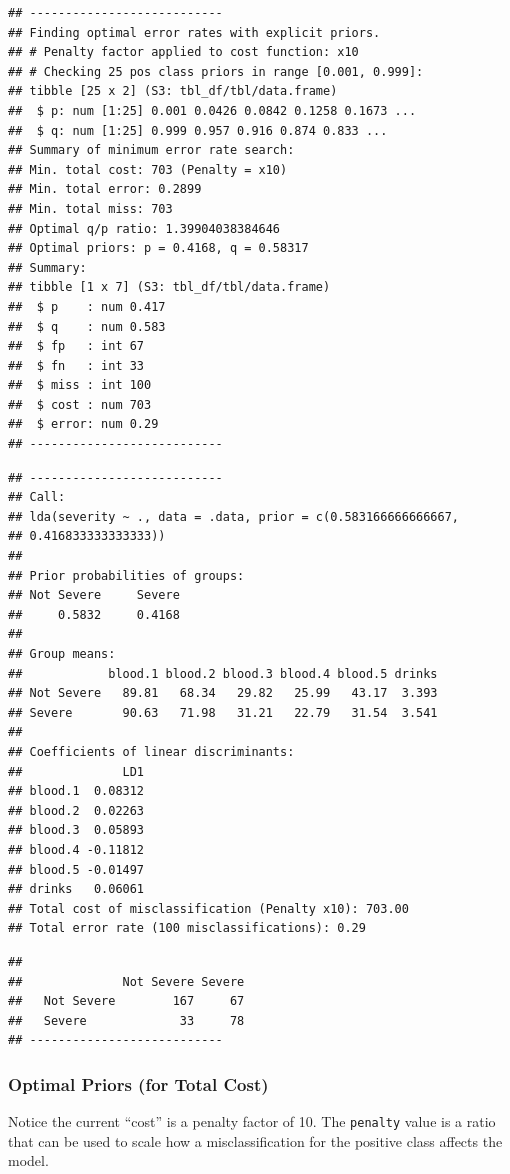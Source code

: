 \documentclass[
  11pt,
  a4paper,
]{scrartcl}
\begin{document}
\begin{verbatim}
## ---------------------------
## Finding optimal error rates with explicit priors.
## # Penalty factor applied to cost function: x10
## # Checking 25 pos class priors in range [0.001, 0.999]:
## tibble [25 x 2] (S3: tbl_df/tbl/data.frame)
##  $ p: num [1:25] 0.001 0.0426 0.0842 0.1258 0.1673 ...
##  $ q: num [1:25] 0.999 0.957 0.916 0.874 0.833 ...
## Summary of minimum error rate search:
## Min. total cost: 703 (Penalty = x10)
## Min. total error: 0.2899
## Min. total miss: 703
## Optimal q/p ratio: 1.39904038384646
## Optimal priors: p = 0.4168, q = 0.58317
## Summary: 
## tibble [1 x 7] (S3: tbl_df/tbl/data.frame)
##  $ p    : num 0.417
##  $ q    : num 0.583
##  $ fp   : int 67
##  $ fn   : int 33
##  $ miss : int 100
##  $ cost : num 703
##  $ error: num 0.29
## ---------------------------
\end{verbatim}

\begin{verbatim}
## ---------------------------
## Call:
## lda(severity ~ ., data = .data, prior = c(0.583166666666667, 
## 0.416833333333333))
## 
## Prior probabilities of groups:
## Not Severe     Severe 
##     0.5832     0.4168 
## 
## Group means:
##            blood.1 blood.2 blood.3 blood.4 blood.5 drinks
## Not Severe   89.81   68.34   29.82   25.99   43.17  3.393
## Severe       90.63   71.98   31.21   22.79   31.54  3.541
## 
## Coefficients of linear discriminants:
##              LD1
## blood.1  0.08312
## blood.2  0.02263
## blood.3  0.05893
## blood.4 -0.11812
## blood.5 -0.01497
## drinks   0.06061
## Total cost of misclassification (Penalty x10): 703.00
## Total error rate (100 misclassifications): 0.29
\end{verbatim}

\begin{verbatim}
##             
##              Not Severe Severe
##   Not Severe        167     67
##   Severe             33     78
## ---------------------------
\end{verbatim}

\hypertarget{optimal-priors-for-total-cost}{%
\subsubsection{Optimal Priors (for Total
Cost)}\label{optimal-priors-for-total-cost}}

Notice the current ``cost'' is a penalty factor of 10. The
\texttt{penalty} value is a ratio that can be used to scale how a
misclassification for the positive class affects the model.
\end{document}
